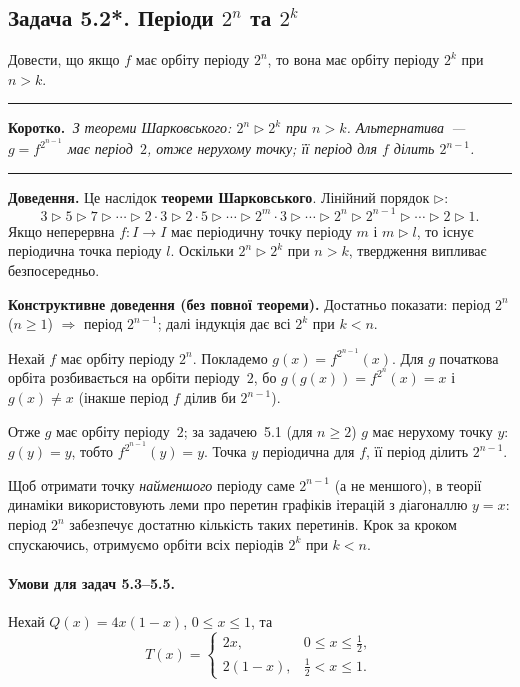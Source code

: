 \documentclass[12pt,a4paper]{article}
\newenvironment{korotko}
  {\par\medskip\noindent\begingroup\color{accent!75!black}\rule{\linewidth}{0.4pt}\par
   \noindent\textbf{Коротко.}\itshape\,}
  {\par\noindent\rule{\linewidth}{0.4pt}\endgroup\medskip}
\begin{document}
\subsection{Задача 5.2*. Періоди $2^n$ та $2^k$}
Довести, що якщо $f$ має орбіту періоду $2^n$, то вона має орбіту періоду
$2^k$ при $n>k$.

\begin{korotko}
З теореми Шарковського: $2^n\rhd 2^k$ при $n>k$. Альтернатива~---
$g=f^{2^{n-1}}$ має період~$2$, отже нерухому точку; її період для $f$
ділить $2^{n-1}$.
\end{korotko}

\noindent\textbf{Доведення.}
Це наслідок \textbf{теореми Шарковського}. Лінійний порядок $\rhd$:
\begin{equation*}
  3\rhd5\rhd7\rhd\cdots\rhd2\cdot3\rhd2\cdot5\rhd\cdots\rhd
  2^m\cdot3\rhd\cdots\rhd2^n\rhd2^{n-1}\rhd\cdots\rhd2\rhd1.
\end{equation*}
Якщо неперервна $f\colon I\to I$ має періодичну точку періоду $m$ і $m\rhd l$,
то існує періодична точка періоду $l$. Оскільки $2^n\rhd2^k$ при $n>k$,
твердження випливає безпосередньо.

\medskip
\noindent\textbf{Конструктивне доведення (без повної теореми).}
Достатньо показати: період $2^n$ ($n\ge1$) $\Rightarrow$ період $2^{n-1}$;
далі індукція дає всі $2^k$ при $k<n$.

Нехай $f$ має орбіту періоду $2^n$. Покладемо $g(x)=f^{2^{n-1}}(x)$.
Для $g$ початкова орбіта розбивається на орбіти періоду~$2$, бо
$g(g(x))=f^{2^n}(x)=x$ і $g(x)\neq x$ (інакше період $f$ ділив би $2^{n-1}$).

Отже $g$ має орбіту періоду~$2$; за задачею~5.1 (для $n\ge2$) $g$ має нерухому
точку $y$: $g(y)=y$, тобто $f^{2^{n-1}}(y)=y$. Точка $y$ періодична для $f$,
її період ділить $2^{n-1}$.

Щоб отримати точку \emph{найменшого} періоду саме $2^{n-1}$ (а не меншого),
в теорії динаміки використовують леми про перетин графіків ітерацій з
діагоналлю $y=x$: період $2^n$ забезпечує достатню кількість таких перетинів.
Крок за кроком спускаючись, отримуємо орбіти всіх періодів $2^k$ при $k<n$.

\paragraph{Умови для задач 5.3--5.5.}
Нехай $Q(x)=4x(1-x)$, $0\leqslant x\leqslant 1$, та
\begin{equation*}
  T(x)=
  \begin{cases}
    2x, & 0\leqslant x\leqslant \tfrac12,\\[0.3em]
    2(1-x), & \tfrac12<x\leqslant 1.
  \end{cases}
\end{equation*}
\end{document}
